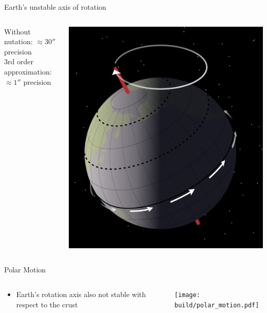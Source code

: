 \documentclass[aspectratio=1610, 9pt]{beamer}
\begin{document}
\begin{frame}{Earth's unstable axis of rotation}
\begin{columns}[c, onlytextwidth]
\begin{column}{0.5\textwidth}
      \medskip
      Without nutation: $\approx\ang{;;30}$ precision \\
      3rd order approximation: $\approx\ang{;;1}$ precision
    \end{column}
    \hfill
    \begin{column}{0.45\textwidth}
      \includegraphics[width=\textwidth]{images/earth_precession.pdf}
    \end{column}
  \end{columns}
\end{frame}

\begin{frame}[c]{Polar Motion}
  \begin{columns}[c, onlytextwidth]
    \begin{column}{0.35\textwidth}
      \begin{itemize}
        \item Earth's rotation axis also not stable with respect to the crust
      \end{itemize}
    \end{column}
    \hfill
    \begin{column}{0.6\textwidth}
      \texttt{[image: build/polar\_motion.pdf]}
    \end{column}
  \end{columns}
\end{frame}
\end{document}

